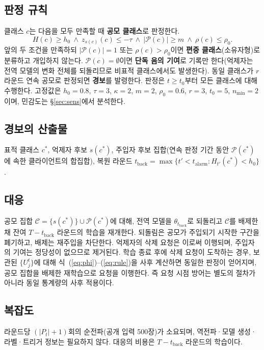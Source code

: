 \documentclass[10pt,a4paper]{article}
\begin{document}
\subsection{판정 규칙}
클래스 $c$는 다음을 모두 만족할 때 \textbf{공모 클래스}로 판정한다.
\begin{equation}
H(c)\ge h_0\ \wedge\ z_{s(c)}(c)\le-\tau\ \wedge\ |\mathcal{P}(c)|\ge m\ \wedge\ \rho(c)\le\rho_0.
\label{eq:rule}
\end{equation}
앞의 두 조건을 만족하되 $|\mathcal{P}(c)|=1$ 또는 $\rho(c)>\rho_0$이면 \textbf{편중 클래스}(소유자형)로 분류하고 개입하지 않는다. $\mathcal{P}(c)=\emptyset$이면 \textbf{단독 음의 기여}로 기록만 한다(억제자는 전역 모델의 변화 전체를 되돌리므로 비표적 클래스에서도 발생한다). 동일 클래스가 $r$ 라운드 연속 공모로 판정되면 \textbf{경보}를 발령한다. 판정은 $t\ge t_0$부터 모든 클래스에 대해 수행한다. 고정값은 $h_0=0.8$, $\tau=3$, $\kappa=2$, $m=2$, $\rho_0=0.6$, $r=3$, $t_0=5$, $n_{\min}=2$이며, 민감도는 \S\ref{sec:sens}에서 분석한다.

\subsection{경보의 산출물}
표적 클래스 $c^*$, 억제자 후보 $s(c^*)$, 주입자 후보 집합(연속 판정 기간 동안 $\mathcal{P}(c^*)$에 속한 클라이언트의 합집합), 복원 라운드 $t_{\mathrm{back}}=\max\{t'<t_{\mathrm{alarm}}: H_{t'}(c^*)<h_0\}$.

\subsection{대응}\label{sec:response}
공모 집합 $\mathcal{C}=\{s(c^*)\}\cup\mathcal{P}(c^*)$에 대해, 전역 모델을 $\theta_{t_{\mathrm{back}}}$로 되돌리고 $\mathcal{C}$를 배제한 채 잔여 $T-t_{\mathrm{back}}$ 라운드의 학습을 재개한다. 되돌림은 공모가 주입되기 시작한 구간을 폐기하고, 배제는 재주입을 차단한다. 억제자의 삭제 요청은 이로써 이행되며, 주입자의 기여는 정당성이 없으므로 제거된다. 학습 종료 후에 삭제 요청이 도착하는 경우, 보관된 $\{U_j^t\}$에 대해 식~(\ref{eq:phi})--(\ref{eq:rule})을 사후 계산하면 동일한 판정이 얻어지며, 공모 집합을 배제한 재학습으로 요청을 이행한다. 즉 요청 시점 방어는 별도의 절차가 아니라 동일 통계량의 사후 적용이다.

\subsection{복잡도}
라운드당 $(|P_t|+1)$회의 순전파(공개 입력 500장)가 소요되며, 역전파·모델 생성·라벨·트리거 정보는 필요하지 않다. 대응의 비용은 $T-t_{\mathrm{back}}$ 라운드의 학습이다.
\end{document}
